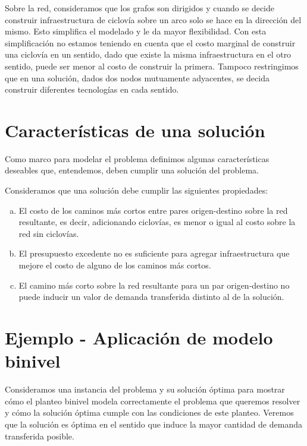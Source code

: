 Sobre la red, consideramos que los grafos son dirigidos y cuando se decide construir infraestructura de ciclovía sobre un arco solo se hace en la dirección del mismo. Esto simplifica el modelado y le da mayor flexibilidad. Con esta simplificación no estamos teniendo en cuenta que el costo marginal de construir una ciclovía en un sentido, dado que existe la misma infraestructura en el otro sentido, puede ser menor al costo de construir la primera. Tampoco restringimos que en una solución, dados dos nodos mutuamente adyacentes, se decida construir diferentes tecnologías en cada sentido.

\section{Características de una solución}
\label{sect:solutioncharacteristics}

Como marco para modelar el problema definimos algunas características deseables que, entendemos, deben cumplir una solución del problema.

Consideramos que una solución debe cumplir las siguientes propiedades:

\begin{enumerate}[(a)]
    \item{El costo de los caminos más cortos entre pares origen-destino sobre la red resultante, es decir, adicionando ciclovías, es menor o igual al costo sobre la red sin ciclovías.}
  \item{\label{budgetexcess} El presupuesto excedente no es suficiente para agregar infraestructura que mejore el costo de alguno de los caminos más cortos.}
  \item{El camino más corto sobre la red resultante para un par origen-destino no puede inducir un valor de demanda transferida distinto al de la solución.}
\end{enumerate}

\section{Ejemplo - Aplicación de modelo binivel}
\label{sect:example1}

Consideramos una instancia del problema y su solución óptima para mostrar cómo el planteo binivel modela correctamente el problema que queremos resolver y cómo la solución óptima cumple con las condiciones de este planteo. Veremos que la solución es óptima en el sentido que induce la mayor cantidad de demanda transferida posible.


